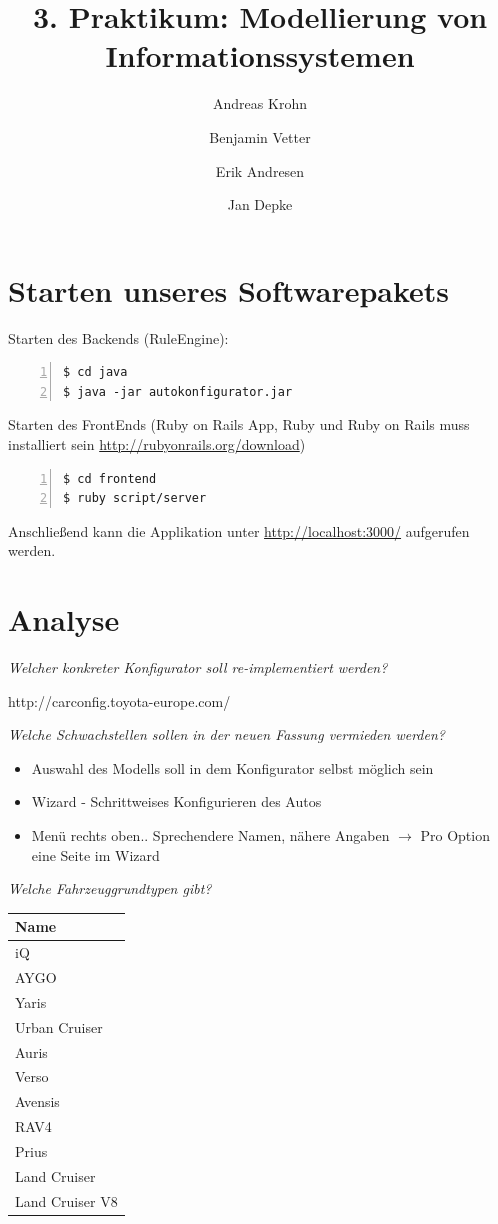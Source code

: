 \documentclass[a4paper,10pt]{article}
\title{3. Praktikum: Modellierung von Informationssystemen}
\author{Andreas Krohn \and Benjamin Vetter \and Erik Andresen \and Jan Depke}
\begin{document}
\maketitle

\tableofcontents

\section{Starten unseres Softwarepakets}

Starten des Backends (RuleEngine):

\begin{lstlisting}[numbers=left]
$ cd java
$ java -jar autokonfigurator.jar
\end{lstlisting}

Starten des FrontEnds (Ruby on Rails App, Ruby und Ruby on Rails muss installiert sein \url{http://rubyonrails.org/download})

\begin{lstlisting}[numbers=left]
$ cd frontend
$ ruby script/server
\end{lstlisting}

Anschließend kann die Applikation unter \url{http://localhost:3000/} aufgerufen werden.

\section{Analyse}

\emph{Welcher konkreter Konfigurator soll re-implementiert werden?}

http://carconfig.toyota-europe.com/

\emph{Welche Schwachstellen sollen in der neuen Fassung vermieden werden?}

\begin{itemize}
 \item Auswahl des Modells soll in dem Konfigurator selbst möglich sein
 \item Wizard - Schrittweises Konfigurieren des Autos
 \item Menü rechts oben.. Sprechendere Namen, nähere Angaben $\rightarrow$ Pro Option eine Seite im Wizard
\end{itemize}

\emph{Welche Fahrzeuggrundtypen gibt?}

\begin{tabular}{|l|}
\hline
Name \\
\hline
iQ \\
AYGO \\
Yaris \\
Urban Cruiser \\
Auris \\
Verso \\
Avensis \\
RAV4 \\
Prius \\
Land Cruiser \\
Land Cruiser V8 \\
\hline
\end{tabular}
\end{document}
